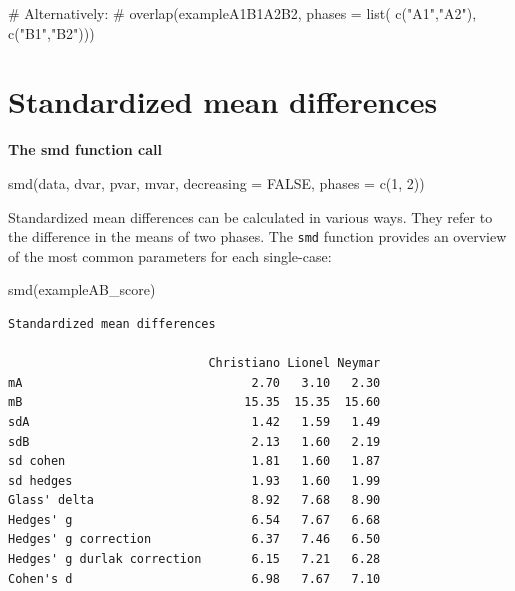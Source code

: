 \documentclass[
  letterpaper,
  DIV=11,
  numbers=noendperiod]{scrreprt}
\newenvironment{Shaded}{\begin{snugshade}}{\end{snugshade}}
\newcommand{\CommentTok}[1]{\textcolor[rgb]{0.37,0.37,0.37}{#1}}
\newcommand{\FunctionTok}[1]{\textcolor[rgb]{0.28,0.35,0.67}{#1}}
\newcommand{\NormalTok}[1]{\textcolor[rgb]{0.00,0.23,0.31}{#1}}
\begin{document}
\begin{Shaded}
\begin{Highlighting}[]
\CommentTok{\# Alternatively:}
\CommentTok{\# overlap(exampleA1B1A2B2, phases = list( c("A1","A2"), c("B1","B2")))}
\end{Highlighting}
\end{Shaded}

\hypertarget{standardized-mean-differences-1}{%
\section{Standardized mean
differences}\label{standardized-mean-differences-1}}

\begin{tcolorbox}[enhanced jigsaw, breakable, rightrule=.15mm, bottomrule=.15mm, arc=.35mm, colback=white, colframe=quarto-callout-tip-color-frame, opacityback=0, leftrule=.75mm, toprule=.15mm, left=2mm]
\begin{minipage}[t]{5.5mm}
\textcolor{quarto-callout-tip-color}{\faLightbulb}
\end{minipage}%
\begin{minipage}[t]{\textwidth - 5.5mm}

\textbf{The smd function call}\vspace{2mm}

smd(data, dvar, pvar, mvar, decreasing = FALSE, phases = c(1, 2))

\end{minipage}%
\end{tcolorbox}

Standardized mean differences can be calculated in various ways. They
refer to the difference in the means of two phases. The \texttt{smd}
function provides an overview of the most common parameters for each
single-case:

\begin{Shaded}
\begin{Highlighting}[]
\FunctionTok{smd}\NormalTok{(exampleAB\_score)}
\end{Highlighting}
\end{Shaded}

\begin{verbatim}
Standardized mean differences

                            Christiano Lionel Neymar
mA                                2.70   3.10   2.30
mB                               15.35  15.35  15.60
sdA                               1.42   1.59   1.49
sdB                               2.13   1.60   2.19
sd cohen                          1.81   1.60   1.87
sd hedges                         1.93   1.60   1.99
Glass' delta                      8.92   7.68   8.90
Hedges' g                         6.54   7.67   6.68
Hedges' g correction              6.37   7.46   6.50
Hedges' g durlak correction       6.15   7.21   6.28
Cohen's d                         6.98   7.67   7.10
\end{verbatim}
\end{document}
